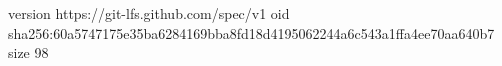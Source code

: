 version https://git-lfs.github.com/spec/v1
oid sha256:60a5747175e35ba6284169bba8fd18d4195062244a6c543a1ffa4ee70aa640b7
size 98

